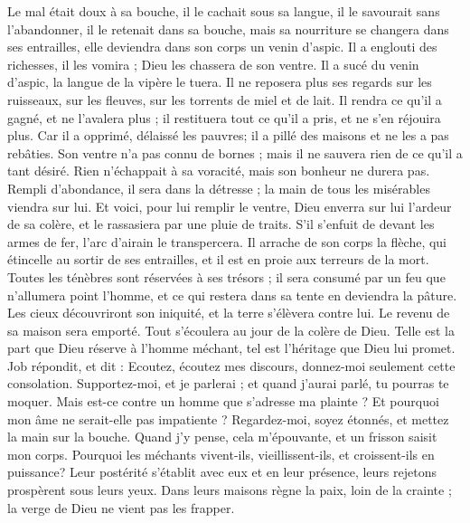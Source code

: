 \begin{multicols}{2}
Le mal était doux à sa bouche, il le cachait sous sa langue,
il le savourait sans l'abandonner, il le retenait dans sa bouche,
mais sa nourriture se changera dans ses entrailles, elle deviendra dans son corps un venin d'aspic.
Il a englouti des richesses, il les vomira ; Dieu les chassera de son ventre.
Il a sucé du venin d'aspic, la langue de la vipère le tuera.
Il ne reposera plus ses regards sur les ruisseaux, sur les fleuves, sur les torrents de miel et de lait.
Il rendra ce qu'il a gagné, et ne l'avalera plus ; il restituera tout ce qu'il a pris, et ne s'en réjouira plus.
Car il a opprimé, délaissé les pauvres; il a pillé des maisons et ne les a pas rebâties.
Son ventre n'a pas connu de bornes ; mais il ne sauvera rien de ce qu'il a tant désiré.
Rien n'échappait à sa voracité, mais son bonheur ne durera pas.
Rempli d'abondance, il sera dans la détresse ; la main de tous les misérables viendra sur lui.
Et voici, pour lui remplir le ventre, Dieu enverra sur lui l'ardeur de sa colère, et le rassasiera par une pluie de traits.
S’il s’enfuit de devant les armes de fer, l’arc d’airain le transpercera.
Il arrache de son corps la flèche, qui étincelle au sortir de ses entrailles, et il est en proie aux terreurs de la mort.
Toutes les ténèbres sont réservées à ses trésors ; il sera consumé par un feu que n'allumera point l'homme, et ce qui restera dans sa tente en deviendra la pâture.
Les cieux découvriront son iniquité, et la terre s'élèvera contre lui.
Le revenu de sa maison sera emporté. Tout s'écoulera au jour de la colère de Dieu.
Telle est la part que Dieu réserve à l'homme méchant, tel est l'héritage que Dieu lui promet.
\VerseOne{}Job répondit, et dit :
Ecoutez, écoutez mes discours, donnez-moi seulement cette consolation.
Supportez-moi, et je parlerai ; et quand j'aurai parlé, tu pourras te moquer.
Mais est-ce contre un homme que s'adresse ma plainte ? Et pourquoi mon âme ne serait-elle pas impatiente ?
Regardez-moi, soyez étonnés, et mettez la main sur la bouche.
Quand j'y pense, cela m'épouvante, et un frisson saisit mon corps.
Pourquoi les méchants vivent-ils, vieillissent-ils, et croissent-ils en puissance?
Leur postérité s'établit avec eux et en leur présence, leurs rejetons prospèrent sous leurs yeux.
Dans leurs maisons règne la paix, loin de la crainte ; la verge de Dieu ne vient pas les frapper.

\end{multicols}
